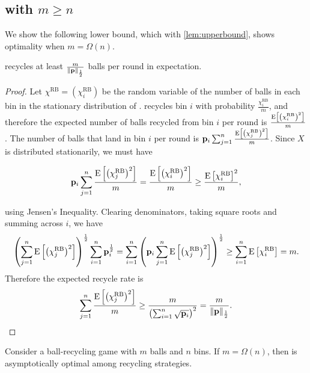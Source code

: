 \subsection{\RB with \texorpdfstring{$m \geq n$}{m >= n}}\label{sec:br-randomballwithmanyballs}

We show the following lower bound, which with \cref{lem:upperbound}, shows
optimality when $m = \Omega(n)$.

\begin{lemma}\label{lem:random-ball-lower}
	\RB recycles at least $\frac{m}{\|\mathbf{p}\|_{\frac{1}{2}}}$ balls per round in
	expectation. 
\end{lemma}

\begin{proof}
	Let $\chi^\mathrm{RB}=(\chi_i^\mathrm{RB})$ be the random variable of the
	number of balls in each bin in the stationary distribution of \RB.  \RB
	recycles bin $i$ with probability $\frac{\chi_i^\mathrm{RB}}{m}$, and
	therefore the expected number of balls recycled from bin $i$ per round is
	$\frac{\mathrm{E}\left[\left(\chi_i^\mathrm{RB}\right)^2\right]}{m}$. The number of balls that
	land in bin $i$ per round is
	$\mathbf{p}_i\sum_{j=1}^n\frac{\mathrm{E}\left[\left(\chi_j^\mathrm{RB}\right)^2\right]}{m}$.  Since
	$X$ is distributed stationarily, we must have

	\begin{equation*}
		\mathbf{p}_i\sum_{j=1}^n\frac{\mathrm{E}\left[\left(\chi_j^\mathrm{RB}\right)^2\right]}{m}
	= \frac{\mathrm{E}\left[\left(\chi_i^\mathrm{RB}\right)^2\right]}{m} \geq \frac{\mathrm{E}\left[\chi_i^\mathrm{RB}\right]^2}{m},
	\end{equation*}

	using Jensen's Inequality. Clearing denominators, taking square roots and
	summing across $i$, we have
        \[ \left(\sum_{j=1}^n \mathrm{E}\left[\left(\chi_j^\mathrm{RB}\right)^2\right]\right)^{\frac{1}{2}} \sum_{i=1}^n \mathbf{p}_i^\frac{1}{2}
        = \sum_{i=1}^n \left( \mathbf{p}_i\sum_{j=1}^n {\mathrm{E}\left[\left(\chi_j^\mathrm{RB}\right)^2\right]} \right )^{\frac{1}{2}} \geq \sum_{i=1}^n \mathrm{E}\left[\chi_i^\mathrm{RB}\right] = m. \]
	Therefore the expected recycle rate is
	\[ \sum_{j=1}^n \frac{\mathrm{E}\left[\left(\chi_j^\mathrm{RB}\right)^2\right]}{m}
	\geq \frac{m}{\left(\sum_{i=1}^n \sqrt{\mathbf{p}_i}\right)^2}
	= \frac{m}{\|\mathbf{p}\|_{\frac{1}{2}}}. \]
\end{proof}

\begin{corollary}\label{cor:rboptmanyballs}
	Consider a ball-recycling game with $m$ balls and $n$ bins.  If $m =
	\Omega(n)$, then \RB is asymptotically optimal among recycling strategies. 
\end{corollary}

